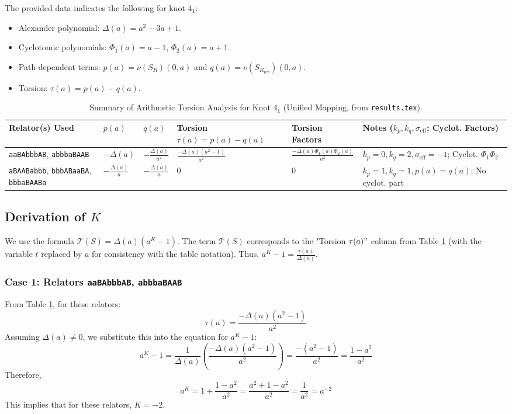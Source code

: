 \documentclass{article}
\begin{document}
\noindent The provided data indicates the following for knot $4_1$:

\begin{itemize}
    \item Alexander polynomial: $\Delta(a) = a^2 - 3a + 1$.
    \item Cyclotomic polynomials: $\Phi_1(a) = a-1$, $\Phi_2(a) = a+1$.
    \item Path-dependent terms: $p(a) = \nu(S_R)(0,a)$ and $q(a) = \nu(S_{R_{\text{rev}}})(0,a)$.
    \item Torsion: $\tau(a) = p(a) - q(a)$.
\end{itemize}

\begin{table}[h!]
\centering
\caption{Summary of Arithmetic Torsion Analysis for Knot $4_1$ (Unified Mapping, from \texttt{results.tex}).}
\label{tab:knot41_data}
\scriptsize
\begin{tabular}{@{}p{3.2cm} p{2.0cm} p{2.0cm} p{2.5cm} p{3.3cm} p{3.3cm}@{}}
\toprule
\textbf{Relator(s) Used} & \textbf{$p(a)$} & \textbf{$q(a)$} & \textbf{Torsion $\tau(a) = p(a) - q(a)$} & \textbf{Torsion Factors} & \textbf{Notes} ($k_p, k_q, \sigma_{\text{eff}}$; Cyclot. Factors) \\
\midrule
\texttt{aaBAbbbAB}, \texttt{abbbaBAAB} & $-\Delta(a)$ & $-\frac{\Delta(a)}{a^2}$ & $\frac{-\Delta(a)(a^2-1)}{a^2}$ & $\frac{-\Delta(a) \Phi_1(a) \Phi_2(a)}{a^2}$ & $k_p=0, k_q=2, \sigma_{\text{eff}}=-1$; Cyclot. $\Phi_1\Phi_2$ \\
\addlinespace
\texttt{aBAABabbb}, \texttt{bbbABaaBA}, \texttt{bbbaBAABa} & $-\frac{\Delta(a)}{a}$ & $-\frac{\Delta(a)}{a}$ & $0$ & $0$ & $k_p=1, k_q=1, p(a)=q(a)$; No cyclot. part \\
\bottomrule
\end{tabular}
\end{table}

\subsection{Derivation of $K$}
We use the formula $\mathcal{T}(S) = \Delta(a)(a^K-1)$. The term $\mathcal{T}(S)$ corresponds to the "Torsion $\tau(a)" $ column from Table \ref{tab:knot41_data} (with the variable $t$ replaced by $a$ for consistency with the table notation).
Thus, $a^K-1 = \frac{\tau(a)}{\Delta(a)}$.

\subsubsection{Case 1: Relators \texttt{aaBAbbbAB}, \texttt{abbbaBAAB}}
From Table \ref{tab:knot41_data}, for these relators:
\[ \tau(a) = \frac{-\Delta(a)(a^2-1)}{a^2} \]
Assuming $\Delta(a) \neq 0$, we substitute this into the equation for $a^K-1$:
\[ a^K-1 = \frac{1}{\Delta(a)} \left( \frac{-\Delta(a)(a^2-1)}{a^2} \right) = \frac{-(a^2-1)}{a^2} = \frac{1-a^2}{a^2} \]
Therefore,
\[ a^K = 1 + \frac{1-a^2}{a^2} = \frac{a^2 + 1 - a^2}{a^2} = \frac{1}{a^2} = a^{-2} \]
This implies that for these relators, $K = -2$.
\end{document}
